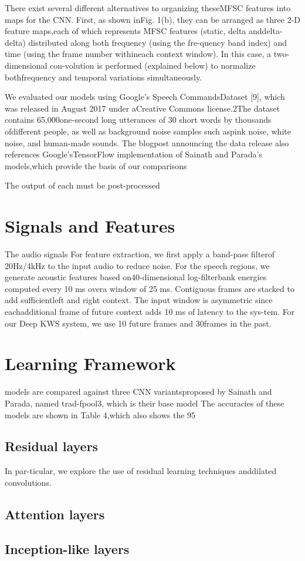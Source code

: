 There exist several different alternatives to organizing theseMFSC features into maps for the CNN. First, as shown inFig. 1(b), they can be arranged as three 2-D feature maps,each of which represents MFSC features (static, delta anddelta-delta) distributed along both frequency (using the fre-quency band index) and time (using the frame number withineach context window). In this case, a two-dimensional con-volution is performed (explained below) to normalize bothfrequency and temporal variations simultaneously. 


We evaluated our models using Google’s Speech CommandsDataset  [9],  which  was  released  in  August  2017  under  aCreative  Commons  license.2The  dataset  contains  65,000one-second long utterances of 30 short words by thousands ofdifferent people, as well as background noise samples such aspink noise, white noise, and human-made sounds.  The blogpost  announcing  the  data  release  also  references  Google’sTensorFlow implementation of Sainath and Parada’s models,which provide the basis of our comparisons


The output of each must be post-processed

\section{Signals and Features}
The audio signals For  feature  extraction,   we  first  apply  a  band-pass  filterof  20Hz/4kHz  to  the  input  audio  to  reduce  noise.    For the speech regions, we generate acoustic features based on40-dimensional log-filterbank energies computed every 10 ms overa window of 25 ms. Contiguous frames are stacked to add sufficientleft and right context. The input window is asymmetric since eachadditional frame of future context adds 10 ms of latency to the sys-tem. For our Deep KWS system, we use 10 future frames and 30frames in the past.



\section{Learning Framework}
 models  are  compared  against  three  CNN  variantsproposed by Sainath and Parada\cite{sainath2015convolutional}, named trad-fpool3, which is their base model   The accuracies of these models are shown in Table 4,which  also  shows  the  95%



\subsection{Residual layers}
In par-ticular, we explore the use of residual learning techniques anddilated convolutions.

\subsection{Attention layers}
\subsection{Inception-like layers}
